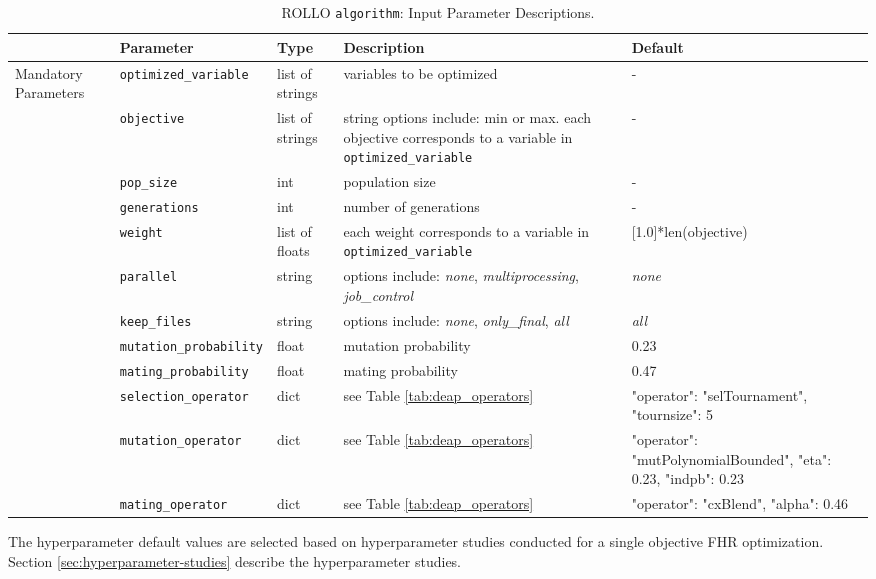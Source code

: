 \begin{table}[htbp]
    \centering
    \onehalfspacing
    \caption{\acrfull{ROLLO} \texttt{algorithm}: Input Parameter Descriptions.}
	\label{tab:algorithm-inputs}
    \footnotesize
    \begin{tabular}{l|lp{1.7cm}p{4cm}p{3cm}}
    \hline
    & \textbf{Parameter} & \textbf{Type} & \textbf{Description} & \textbf{Default} \\
    \hline
    \multirow{9}{1.8cm}{Mandatory Parameters} 
    & \texttt{optimized\_variable} & list of strings & variables to be optimized & -\\
    \cline{2-5}
    & \texttt{objective} & list of strings & string options include: min or max.
    each objective corresponds to a variable in \texttt{optimized\_variable} & -\\
    \cline{2-5}
    & \texttt{pop\_size} & int & population size & -\\
    \cline{2-5}
    & \texttt{generations} & int & number of generations & -\\
    \hline
    \multirow{9}{1.8cm}{Optional Parameters} 
    & \texttt{weight} & list of floats & each weight corresponds to a variable in \texttt{optimized\_variable} & \scriptsize{[1.0]*len(objective)}\\
    \cline{2-5}
    & \texttt{parallel} & string & options include: \textit{none}, \textit{multiprocessing}, \textit{job\_control} & \textit{none} \\
    \cline{2-5}
    & \texttt{keep\_files} & string & options include: \textit{none}, \textit{only\_final}, \textit{all} & \textit{all} \\
    \cline{2-5}
    & \texttt{mutation\_probability} & float & mutation probability & 0.23 \\
    \cline{2-5}
    & \texttt{mating\_probability} & float & mating probability & 0.47 \\
    \cline{2-5}
    & \texttt{selection\_operator} & dict & see Table \ref{tab:deap_operators} & \scriptsize{{"operator": "selTournament", "tournsize": 5}}\\
    \cline{2-5}
    & \texttt{mutation\_operator} & dict & see Table \ref{tab:deap_operators} & \scriptsize{{"operator": "mutPolynomialBounded", "eta": 0.23, "indpb": 0.23}}\\
    \cline{2-5}
    & \texttt{mating\_operator} & dict & see Table \ref{tab:deap_operators} & \scriptsize{{"operator": "cxBlend", "alpha": 0.46}}\\
    \hline 
    \end{tabular}
    \end{table}
The hyperparameter default values are selected based on hyperparameter studies conducted 
for a single objective \gls{FHR} optimization. 
Section \ref{sec:hyperparameter-studies} describe the hyperparameter studies. 

